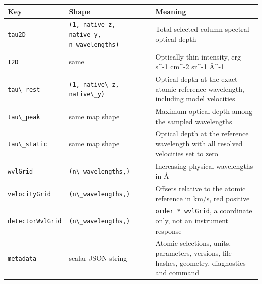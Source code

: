 \documentclass[
]{article}
\newcommand{\passthrough}[1]{#1}
\newcounter{none} %
\begin{document}
{\def\LTcaptype{none} %
\begin{longtable}[]{@{}
  >{\raggedright\arraybackslash}p{}
  >{\raggedright\arraybackslash}p{}
  >{\raggedright\arraybackslash}p{}@{}}
\toprule\noalign{}
\begin{minipage}[b]{\linewidth}\raggedright
Key
\end{minipage} & \begin{minipage}[b]{\linewidth}\raggedright
Shape
\end{minipage} & \begin{minipage}[b]{\linewidth}\raggedright
Meaning
\end{minipage} \\
\midrule\noalign{}
\endhead
\bottomrule\noalign{}
\endlastfoot
\passthrough{\lstinline!tau2D!} &
\texttt{(1, native\_z, native\_y, }\allowbreak\texttt{n\_wavelengths)} &
Total selected-column spectral optical depth \\
\passthrough{\lstinline!I2D!} & same & Optically thin intensity, erg
s\^{}-1 cm\^{}-2 sr\^{}-1 Å\^{}-1 \\
\passthrough{\lstinline!tau\_rest!} &
\passthrough{\lstinline!(1, native\_z, native\_y)!} & Optical depth at
the exact atomic reference wavelength, including model velocities \\
\passthrough{\lstinline!tau\_peak!} & same map shape & Maximum optical
depth among the sampled wavelengths \\
\passthrough{\lstinline!tau\_static!} & same map shape & Optical depth
at the reference wavelength with all resolved velocities set to zero \\
\passthrough{\lstinline!wvlGrid!} &
\passthrough{\lstinline!(n\_wavelengths,)!} & Increasing physical
wavelengths in Å \\
\passthrough{\lstinline!velocityGrid!} &
\passthrough{\lstinline!(n\_wavelengths,)!} & Offsets relative to the
atomic reference in km/s, red positive \\
\passthrough{\lstinline!detectorWvlGrid!} &
\passthrough{\lstinline!(n\_wavelengths,)!} &
\passthrough{\lstinline!order * wvlGrid!}, a coordinate only, not an
instrument response \\
\passthrough{\lstinline!metadata!} & scalar JSON string & Atomic
selections, units, parameters, versions, file hashes, geometry,
diagnostics and command \\
\end{longtable}
}
\end{document}
